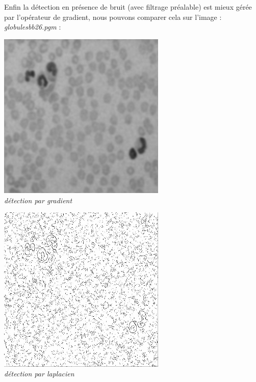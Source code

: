 \documentclass[a4,12pt]{article}
\begin{document}
\vspace{2em}
Enfin la détection en présence de bruit (avec filtrage préalable) est mieux gérée par l'opérateur de gradient, nous pouvons comparer cela sur l'image : \textit{globulesbb26.pgm} :
\begin{center}
	\begin{minipage}[c]{0.49\linewidth}
		\begin{center}
			\includegraphics[width = 80mm]{./img/globulesbb26_filtrer3.jpg}\\
			\textit{détection par gradient}\\
		\end{center}
	\end{minipage}
	\begin{minipage}[c]{0.49\linewidth}
		\begin{center}
			\includegraphics[width = 80mm]{./img/globulesbb26fg-2-ctr-1.jpg}\\
			\textit{détection par laplacien}\\
		\end{center}
	\end{minipage}
\end{center}


\end{document}
